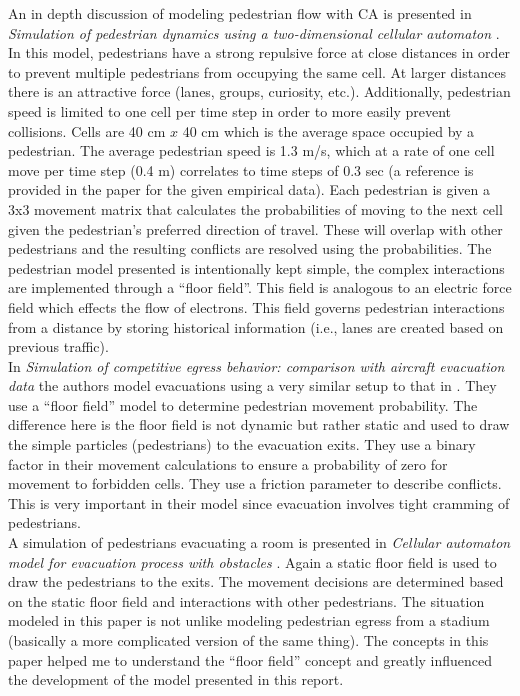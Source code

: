 \documentclass[paper=a4, fontsize=11pt]{scrartcl}
\numberwithin{equation}{section}		%
\numberwithin{figure}{section}			%
\numberwithin{table}{section}		    %
\begin{document}
	\noindent
	An in depth discussion of modeling pedestrian flow with CA is presented in \emph{Simulation of 
	pedestrian dynamics using a two-dimensional cellular automaton} \cite{burstedde2001simulation}. 
	In this model, pedestrians have a strong repulsive force at close distances in order to prevent 
	multiple pedestrians from occupying the same cell. At larger distances there is an attractive 
	force (lanes, groups, curiosity, etc.). Additionally, pedestrian speed is limited to one cell 
	per time step in order to more easily prevent collisions. Cells are 40 cm $x$ 40 cm which 
	is the average space occupied by a pedestrian. The average pedestrian speed is 1.3 m/s, which 
	at a rate of one cell move per time step (0.4 m) correlates to time steps of 0.3 sec (a 
	reference is provided in the paper for the given empirical data). Each pedestrian is given a 
	3x3 movement matrix that calculates the probabilities of moving to the next cell given the 
	pedestrian's preferred direction of travel. These will overlap with other pedestrians and the 
	resulting conflicts are resolved using the probabilities. The pedestrian model presented is 
	intentionally kept simple, the complex interactions are implemented through a ``floor field''. 
	This field is analogous to an electric force field which effects the flow of electrons. This 
	field governs pedestrian interactions from a distance by storing historical information (i.e., 
	lanes are created based on previous traffic). \\

	\noindent
	In \emph{Simulation of competitive egress behavior: comparison with aircraft evacuation data} 
	\cite{kirchner2003simulation} the authors model evacuations using a very similar setup 
	to that in \cite{burstedde2001simulation}. They use a ``floor field'' model to 
	determine pedestrian movement probability. The difference here is the floor field is not 
	dynamic but rather static and used to draw the simple particles (pedestrians) to the evacuation 
	exits. They	use a binary factor in their movement calculations to ensure a probability of zero 
	for movement to forbidden cells. They use a friction parameter to describe conflicts. This is 
	very important in their model since evacuation involves tight cramming of pedestrians.\\
	
	\noindent
	A simulation of pedestrians evacuating a room is presented in \emph{Cellular automaton model 
	for evacuation process with obstacles} \cite{varas2007cellular}. Again a static floor field is 
	used to draw the pedestrians to the exits. The movement decisions are determined based on the 
	static floor field and interactions with other pedestrians. The situation modeled in this paper 
	is not unlike modeling pedestrian egress from a stadium (basically a more complicated version 
	of the same thing). The concepts in this paper helped me to understand the ``floor field'' 
	concept and greatly influenced the development of the model presented in this report.\\
	
\end{document}
